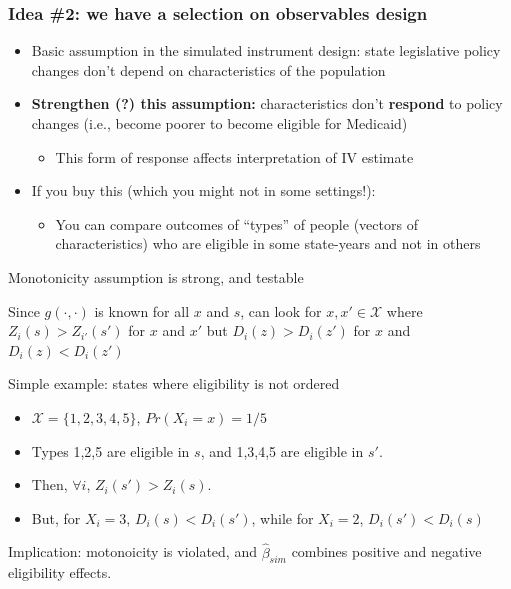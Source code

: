 \documentclass[notes,11pt, aspectratio=169]{beamer}
\newenvironment{wideitemize}{\itemize\addtolength{\itemsep}{10pt}}{\enditemize}
\begin{document}
\begin{frame}
\frametitle{Idea \#2: we have a selection on observables design}

\begin{itemize}
\item Basic assumption in the simulated instrument design: state legislative policy changes don't depend on characteristics of the population 
\item \textbf{Strengthen (?) this assumption:} characteristics don't \textbf{respond} to policy changes (i.e., become poorer to become eligible for Medicaid) 
	\begin{itemize}
	\item This form of response affects interpretation of IV estimate 
	\end{itemize}
\item If you buy this (which you might not in some settings!): 
	\begin{itemize}
	\item You can compare outcomes of ``types'' of people (vectors of characteristics) who are eligible in some state-years and not in others
	\end{itemize}
\end{itemize} 

\end{frame}


\begin{frame}{Monotonicity assumption is strong, and testable}
  \begin{wideitemize}
  \item Since $g(\cdot, \cdot)$ is known for all $x$ and $s$, can
    look for $x, x' \in \mathcal{X}$ where $Z_{i}(s) > Z_{i'}(s')$ for
    $x$ and $x'$ but $D_{i}(z) > D_{i}(z')$ for $x$ and
    $D_{i}(z) < D_{i}(z')$
  \item Simple example: states where eligibility is not ordered
    \begin{itemize}
    \item $\mathcal{X} = \{1,2,3,4,5\}$, $Pr(X_{i} = x) = 1/5$
    \item Types 1,2,5 are eligible in $s$, and 1,3,4,5 are eligible in $s'$.
    \item Then, $\forall i$, $Z_{i}(s') > Z_{i}(s)$.
    \item But, for $X_{i} = 3$, $D_{i}(s) < D_{i}(s')$, while for
      $X_{i} = 2$, $D_{i}(s') < D_{i}(s)$
    \end{itemize}
  \item Implication: motonoicity is violated, and $\hat{\beta}_{sim}$
    combines positive and negative eligibility effects.
  \end{wideitemize}
\end{frame}
\end{document}
